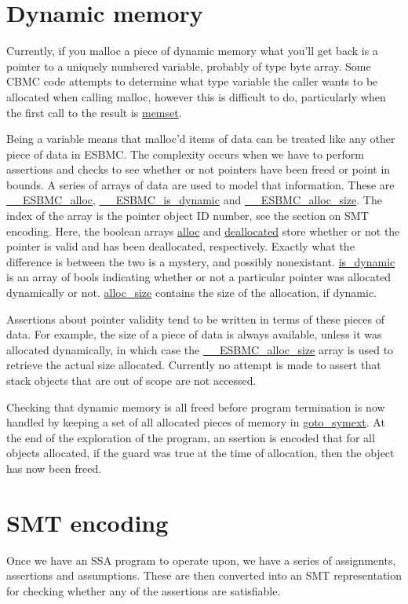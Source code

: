 \documentclass{article}
\begin{document}
\section{Dynamic memory}

Currently, if you malloc a piece of dynamic memory what you'll get
back is a pointer to a uniquely numbered variable, probably of type byte array.
Some CBMC code attempts to determine what type variable the caller wants to be
allocated when calling malloc, however this is difficult to do, particularly
when the first call to the result is \url{memset}.

Being a variable means that malloc'd items of data can be treated like any other
piece of data in ESBMC. The complexity occurs when we have to perform assertions
and checks to see whether or not pointers have been freed or point in bounds.
A series of arrays of data are used to model that information. These are
\url{__ESBMC_alloc}, \url{__ESBMC_is_dynamic} and \url{__ESBMC_alloc_size}.
The index of the array is the pointer object ID number, see the section on
SMT encoding. Here, the boolean arrays \url{alloc} and \url{deallocated}
store whether or not the pointer is valid and has been deallocated,
respectively. Exactly what the difference is between the two is a mystery,
and possibly nonexistant. \url{is_dynamic} is an array of bools indicating
whether or not a particular pointer was allocated dynamically or not.
\url{alloc_size} contains the size of the allocation, if dynamic.

Assertions about pointer validity tend to be written in terms of these pieces
of data. For example, the size of a piece of data is always available, unless
it was allocated dynamically, in which case the \url{__ESBMC_alloc_size}
array is used to retrieve the actual size allocated. Currently no attempt is
made to assert that stack objects that are out of scope are not accessed.

Checking that dynamic memory is all freed before program termination is now
handled by keeping a set of all allocated pieces of memory in
\url{goto_symext}. At the end of the exploration of the program, an
ssertion is encoded that for all objects allocated, if the guard was true
at the time of allocation, then the object has now been freed.

\section{SMT encoding}

Once we have an SSA program to operate upon, we have a series of assignments,
assertions and assumptions. These are then converted into an SMT representation
for checking whether any of the assertions are satisfiable.
\end{document}
